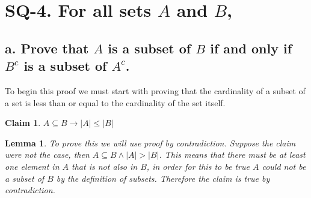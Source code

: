 \documentclass{article}
\newtheorem*{claim}{Claim}
\newtheorem{lemma}{Lemma}
\begin{document}
\section*{SQ-4. For all sets $A$ and $B$,}
\subsection*{a. Prove that $A$ is a subset of $B$ if and only if $B^c$ is a subset of $A^c$.}
To begin this proof we must start with proving that the cardinality of a subset of a set is less than or equal to the cardinality of the set itself.
\begin{claim}
    $A \subseteq B \rightarrow |A| \leq |B|$
\end{claim}
\begin{lemma}
    To prove this we will use proof by contradiction. Suppose the claim were not the case, then $A \subseteq B \wedge |A| > |B|$. This means that there must be at least one element in $A$ that is not also in $B$, in order for this to be true $A$ could not be a subset of $B$ by the definition of subsets. Therefore the claim is true by contradiction.
\end{lemma}
    
\end{document}
